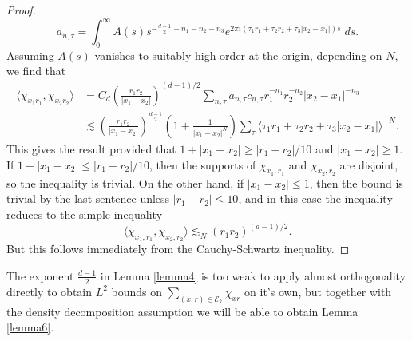 \begin{proof}
\begin{equation}
      a_{n,\tau} = \int_0^\infty A(s) s^{- \frac{d-1}{2} - n_1 - n_2 - n_3} e^{2 \pi i (\tau_1 r_1 + \tau_2 r_2 + \tau_3 |x_2 - x_1|) s}\; ds.
    \end{equation}
    Assuming $A(s)$ vanishes to suitably high order at the origin, depending on $N$, we find that
    \begin{equation}
    \begin{split}
        \langle \chi_{x_1 r_1}, \chi_{x_2 r_2} \rangle &= C_d \left( \frac{r_1r_2}{|x_1 - x_2|} \right)^{(d-1)/2} \sum\nolimits_{n,\tau} a_{n,\tau} c_{n,\tau} r_1^{-n_1} r_2^{-n_2} |x_2 - x_1|^{-n_3}\\
        &\lesssim \left( \frac{r_1r_2}{|x_1 - x_2|} \right)^{\frac{d-1}{2}} \left(1 + \frac{1}{|x_1 - x_2|^N} \right) \sum\nolimits_{\tau} \langle \tau_1 r_1 + \tau_2 r_2 + \tau_3 |x_2 - x_1| \rangle^{-N}.
    \end{split}
    \end{equation}
    This gives the result provided that $1 + |x_1 - x_2| \geq |r_1 - r_2| / 10$ and $|x_1 - x_2| \geq 1$. If $1 + |x_1 - x_2| \leq |r_1 - r_2| / 10$, then the supports of $\chi_{x_1,r_1}$ and $\chi_{x_2,r_2}$ are disjoint, so the inequality is trivial. On the other hand, if $|x_1 - x_2| \leq 1$, then the bound is trivial by the last sentence unless $|r_1 - r_2| \leq 10$, and in this case the inequality reduces to the simple inequality
    \begin{equation}
      \langle \chi_{x_1,r_1}, \chi_{x_2,r_2} \rangle \lesssim_N (r_1 r_2)^{(d-1)/2}. 
    \end{equation}
    But this follows immediately from the Cauchy-Schwartz inequality.
\end{proof}

The exponent $\tfrac{d-1}{2}$ in Lemma \ref{lemma4} is too weak to apply almost orthogonality directly to obtain $L^2$ bounds on $\sum\nolimits_{(x,r) \in \mathcal{E}_k} \chi_{xr}$ on it's own, but together with the density decomposition assumption we will be able to obtain Lemma \ref{lemma6}.

